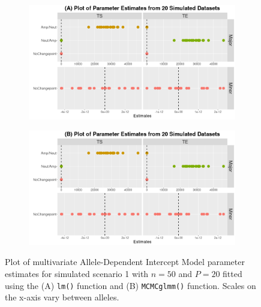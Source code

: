 \begin{figure}[!ht]
\vspace{0.5cm}
     \begin{subfigure}[t]{.49\textwidth}
      \centering
     \includegraphics[width = 1\textwidth]{../figures/Chapter_5/Multi_lm_Prediction_Simulation.png}
    \end{subfigure}%
     \begin{subfigure}[t]{.49\textwidth}
      \centering
       \includegraphics[width = 1\textwidth]{../figures/Chapter_5/Multi_MCMC_Prediction_Simulation.png}
    \end{subfigure} 
     \caption[Plot of multivariate Allele-Dependent Intercept Model parameter estimates for simulated scenario 1 with $n = 50$ and $P = 20$.]{Plot of multivariate Allele-Dependent Intercept Model parameter estimates for simulated scenario 1 with $n = 50$ and $P = 20$ fitted using the (A) \texttt{lm()} function and (B) \texttt{MCMCglmm()} function. Scales on the x-axis vary between alleles.}
     \label{fig:DP_2}
\end{figure}

